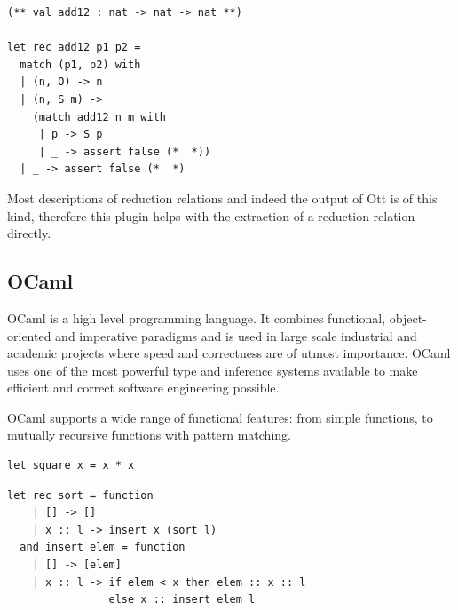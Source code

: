 \documentclass[12pt,twoside,notitlepage]{report}
\theoremstyle{plain}%
\theoremstyle{definition}
\theoremstyle{remark}
\begin{document}
\begin{minipage}{\linewidth}

\begin{lstlisting}[language={Coq},caption={Coq to OCaml extraction of a logical inductive relation}, label={lst:coqlogindextractex}]
(** val add12 : nat -> nat -> nat **)

let rec add12 p1 p2 =
  match (p1, p2) with
  | (n, O) -> n
  | (n, S m) ->
    (match add12 n m with
     | p -> S p
     | _ -> assert false (*  *))
  | _ -> assert false (*  *)
\end{lstlisting}

\end{minipage}

Most descriptions of reduction relations and indeed the output of Ott is of this kind, therefore this plugin helps with the extraction of a reduction relation directly. 

\subsection{OCaml}
OCaml is a high level programming language. It combines functional, object-oriented and imperative paradigms and is used in large scale industrial and academic projects where speed and correctness are of utmost importance. OCaml uses one of the most powerful type and inference systems available to make efficient and correct software engineering possible.

OCaml supports a wide range of functional features: from simple functions, to mutually recursive functions with pattern matching.
\vspace{3mm}

\begin{minipage}{\linewidth}
\begin{lstlisting}[caption={OCaml simple function example: square}]
let square x = x * x
\end{lstlisting}

\end{minipage}

\begin{minipage}{\linewidth}

\begin{lstlisting}[caption={OCaml complex function example: insertion sort}]
let rec sort = function
    | [] -> []
    | x :: l -> insert x (sort l)
  and insert elem = function
    | [] -> [elem]
    | x :: l -> if elem < x then elem :: x :: l
                else x :: insert elem l
\end{lstlisting}

\end{minipage}
\end{document}
